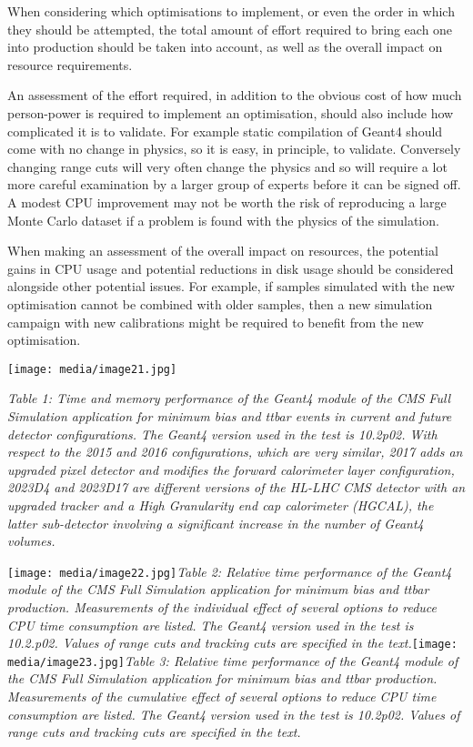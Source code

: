 \documentclass[12pt,a4paper]{article}
\begin{document}
When considering which optimisations to implement, or even the order in
which they should be attempted, the total amount of effort required to
bring each one into production should be taken into account, as well as
the overall impact on resource requirements.

An assessment of the effort required, in addition to the obvious cost of
how much person-power is required to implement an optimisation, should
also include how complicated it is to validate. For example static
compilation of Geant4 should come with no change in physics, so it is
easy, in principle, to validate. Conversely changing range cuts will
very often change the physics and so will require a lot more careful
examination by a larger group of experts before it can be signed off. A
modest CPU improvement may not be worth the risk of reproducing a large
Monte Carlo dataset if a problem is found with the physics of the
simulation.

When making an assessment of the overall impact on resources, the
potential gains in CPU usage and potential reductions in disk usage
should be considered alongside other potential issues. For example, if
samples simulated with the new optimisation cannot be combined with
older samples, then a new simulation campaign with new calibrations
might be required to benefit from the new optimisation.

\texttt{[image: media/image21.jpg]}

\emph{Table 1: Time and memory performance of the Geant4 module of the
CMS Full Simulation application for minimum bias and ttbar events in
current and future detector configurations. The Geant4 version used in
the test is 10.2p02. With respect to the 2015 and 2016 configurations,
which are very similar, 2017 adds an upgraded pixel detector and
modifies the forward calorimeter layer configuration, 2023D4 and 2023D17
are different versions of the HL-LHC CMS detector with an upgraded
tracker and a High Granularity end cap calorimeter (HGCAL), the latter
sub-detector involving a significant increase in the number of Geant4
volumes. }

\texttt{[image: media/image22.jpg]}\emph{Table
2: Relative time performance of the Geant4 module of the CMS Full
Simulation application for minimum bias and ttbar production.
Measurements of the individual effect of several options to reduce CPU
time consumption are listed. The Geant4 version used in the test is
10.2.p02. Values of range cuts and tracking cuts are specified in the
text.}\texttt{[image: media/image23.jpg]}\emph{Table
3: Relative time performance of the Geant4 module of the CMS Full
Simulation application for minimum bias and ttbar production.
Measurements of the cumulative effect of several options to reduce CPU
time consumption are listed. The Geant4 version used in the test is
10.2p02. Values of range cuts and tracking cuts are specified in the
text.}
\end{document}
